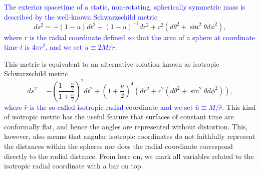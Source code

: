 \documentclass{aa}
\newcommand{\be}{\begin{equation}}
\newcommand{\ee}{\end{equation}}
\newcommand{\refe}[1]{\textcolor{blue}{{#1}}}
\newcommand{\refedel}[1]{}
\newcommand{\sch}{Schwarzschild }
\newcommand{\rb}{\ensuremath{\bar{r}}}
\newcommand{\ub}{\ensuremath{\bar{u}}}
\begin{document}
\refedel{The spacetime metric around a static non-rotating spherically symmetric object is given by the well known \sch solution}
\refe{The exterior spacetime of a static, non-rotating, spherically symmetric mass is described by the well-known Schwarzschild metric}
\be
ds^2  = -(1-u) dt^2 + (1-u)^{-1}dr^2+r^2(d\theta^2+\sin^2\theta d\phi^2),
\ee
\refe{where $r$ is the radial coordinate defined so that the area of a sphere at coordinate time $t$ is $4\pi r^2$, and we set $u \equiv 2M/r$.}

This metric is equivalent to an alternative solution known as isotropic \sch metric \citep[see e.g.][]{MTW73}
\be
\label{eq:ISch}
ds^2 = -\left( \frac{1-\frac{\ub}{2}}{1+\frac{\ub}{2}} \right)^2 dt^2 + \left( 1+\frac{\ub}{2} \right)^4(d\rb^2 + \rb^2(d\theta^2+\sin^2\theta d\phi^2)),
\ee
\refe{where $\rb$ is the so-called isotropic radial coordinate and we set $\ub \equiv M/\rb$.}
This kind of isotropic metric has the useful feature that surfaces of constant time are conformally flat, and hence the angles are represented without distortion.
This, however, also means that angular isotropic coordinates do not faithfully represent the distances within the spheres nor does the radial coordinate correspond directly to the radial distance.
From here on, we mark all variables related to the isotropic radial coordinate with a bar on top.
\end{document}

